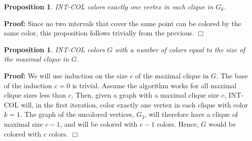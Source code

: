 \documentclass[11pt]{article} \usepackage{amssymb}
\newtheorem{proposition}[theorem]{Proposition}
\newenvironment{proof}{\noindent \textbf{Proof:}}{$\Box$}
\begin{document}
\begin{proposition}
  INT-COL colors exactly one vertex in each clique in $G_k$.
\end{proposition}
\begin{proof}
  Since no two intervals that cover the same point can be colored by the same
  color, this proposition follows trivially from the previous.
\end{proof}

\begin{proposition}
  INT-COL colors $G$ with a number of colors equal to the size of the maximal
  clique in $G$. 
\end{proposition}
\begin{proof}
  We will use induction on the size $c$ of the maximal clique in $G$. The base
  of the induction $c=0$ is trivial. Assume the algorithm works for all 
  maximal clique sizes less than $c$. Then, given a graph with a maximal clique
  size $c$, INT-COL will, in the first iteration, color exactly one vertex
  in each clique with color $k=1$. The graph of the uncolored vertices, $G_2$,
  will therefore have a clique of maximal size $c-1$, and will be colored with 
  $c-1$ colors. Hence, $G$ would be colored with $c$ colors.
\end{proof}
\end{document}
